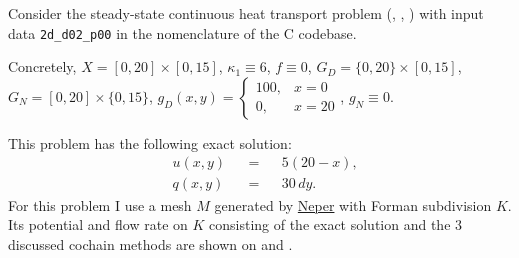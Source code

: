 \begin{example}
  \label{cmc/diffusion/continuous/steady_state/examples/2d_d02_p00-example}
  Consider the steady-state continuous heat transport problem
  (,
   ,
   )
  with input data \verb|2d_d02_p00| in the nomenclature of the C codebase.

  Concretely,
    $X = [0, 20] \times [0, 15]$,
    $\kappa_1 \equiv 6$,
    $f \equiv 0$,
    $G_D = \{0, 20\} \times [0, 15]$,
    $G_N = [0, 20] \times \{0, 15\}$,
    $g_D(x, y) = \begin{cases} 100, & x = 0 \\ 0, & x = 20 \end{cases}$,
    $g_N \equiv 0$.

  This problem has the following exact solution:
  \begin{subequations}
    \begin{alignat}{3}
      & u(x, y) && = && 5 (20 - x), \\
      & q(x, y) && = && 30 \, d y.
    \end{alignat}
  \end{subequations}
  For this problem I use a mesh $M$ generated by
  \href{https://neper.info/}{Neper} with Forman subdivision $K$.
  Its potential and flow rate on $K$ consisting of the exact solution and the
  $3$ discussed cochain methods are shown on
  and
  .
\end{example}
